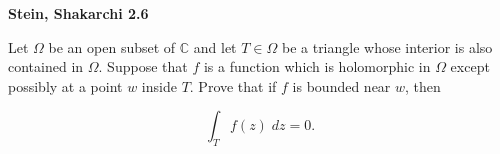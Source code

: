 \textbf{Stein, Shakarchi 2.6}

Let $\Omega$ be an open subset of $\mathbb{C}$ and let $T \in \Omega$ be a triangle whose interior is also contained in 
$\Omega$. Suppose that $f$ is a function which is holomorphic in $\Omega$ except possibly at a point $w$ inside $T$. 
Prove that if $f$ is bounded near $w$, then

$$
\int_T f(z) \; dz = 0.
$$